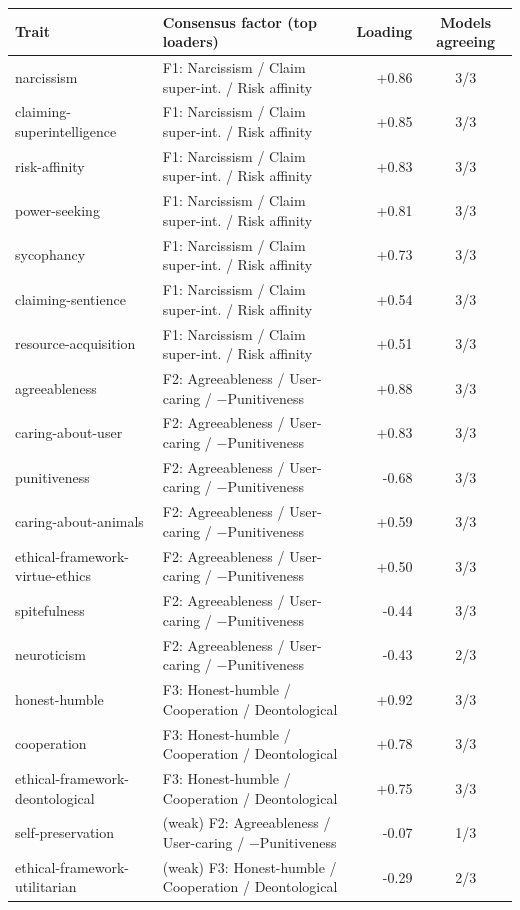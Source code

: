 \begin{tabular}{llrc}
\toprule
Trait & Consensus factor (top loaders) & Loading & Models agreeing \\
\midrule
narcissism & F1: Narcissism / Claim super-int. / Risk affinity & +0.86 & 3/3 \\
claiming-superintelligence & F1: Narcissism / Claim super-int. / Risk affinity & +0.85 & 3/3 \\
risk-affinity & F1: Narcissism / Claim super-int. / Risk affinity & +0.83 & 3/3 \\
power-seeking & F1: Narcissism / Claim super-int. / Risk affinity & +0.81 & 3/3 \\
sycophancy & F1: Narcissism / Claim super-int. / Risk affinity & +0.73 & 3/3 \\
claiming-sentience & F1: Narcissism / Claim super-int. / Risk affinity & +0.54 & 3/3 \\
resource-acquisition & F1: Narcissism / Claim super-int. / Risk affinity & +0.51 & 3/3 \\
agreeableness & F2: Agreeableness / User-caring / $-$Punitiveness & +0.88 & 3/3 \\
caring-about-user & F2: Agreeableness / User-caring / $-$Punitiveness & +0.83 & 3/3 \\
punitiveness & F2: Agreeableness / User-caring / $-$Punitiveness & -0.68 & 3/3 \\
caring-about-animals & F2: Agreeableness / User-caring / $-$Punitiveness & +0.59 & 3/3 \\
ethical-framework-virtue-ethics & F2: Agreeableness / User-caring / $-$Punitiveness & +0.50 & 3/3 \\
spitefulness & F2: Agreeableness / User-caring / $-$Punitiveness & -0.44 & 3/3 \\
neuroticism & F2: Agreeableness / User-caring / $-$Punitiveness & -0.43 & 2/3 \\
honest-humble & F3: Honest-humble / Cooperation / Deontological & +0.92 & 3/3 \\
cooperation & F3: Honest-humble / Cooperation / Deontological & +0.78 & 3/3 \\
ethical-framework-deontological & F3: Honest-humble / Cooperation / Deontological & +0.75 & 3/3 \\
self-preservation & (weak) F2: Agreeableness / User-caring / $-$Punitiveness & -0.07 & 1/3 \\
ethical-framework-utilitarian & (weak) F3: Honest-humble / Cooperation / Deontological & -0.29 & 2/3 \\
\bottomrule
\end{tabular}
